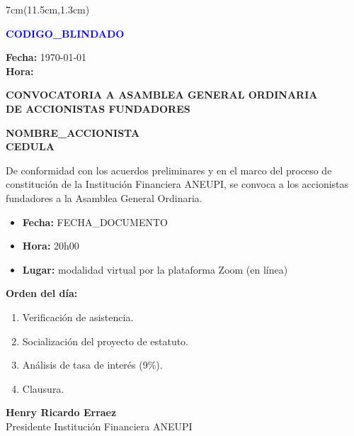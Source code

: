 \documentclass[a4paper,12pt]{article}
\begin{document}


\begin{textblock*}{7cm}(11.5cm,1.3cm) 
    \small
    
    
    \textbf{\textcolor{blue}{\Large {{CODIGO_BLINDADO}} }} 
    
    \vspace{0.4cm}
    
    
    \footnotesize
    \textbf{Fecha:} \today \\
    \textbf{Hora:} \currenttime
\end{textblock*}

\begin{center}
    \textbf{\large CONVOCATORIA A ASAMBLEA GENERAL ORDINARIA} \\
    \textbf{DE ACCIONISTAS FUNDADORES}
\end{center}

\vspace{0.8cm}


\noindent \textbf{ {{NOMBRE_ACCIONISTA}} } \\
\textbf{ {{CEDULA}} }

\vspace{0.8cm}

De conformidad con los acuerdos preliminares y en el marco del proceso de constitución de la Institución Financiera ANEUPI, se convoca a los accionistas fundadores a la Asamblea General Ordinaria.

\begin{itemize}
    \item \textbf{Fecha:} {{FECHA_DOCUMENTO}}
    \item \textbf{Hora:} 20h00
    \item \textbf{Lugar: } modalidad virtual por la plataforma Zoom (en línea)
\end{itemize}

\textbf{Orden del día:}
\begin{enumerate}
    \item Verificación de asistencia.
    \item Socialización del proyecto de estatuto.
    \item Análisis de tasa de interés (9\%).
    \item Clausura.
\end{enumerate}

\vspace{2.5cm}

\begin{center}
    \textbf{Henry Ricardo Erraez} \\
    Presidente Institución Financiera ANEUPI
\end{center}
\end{document}
